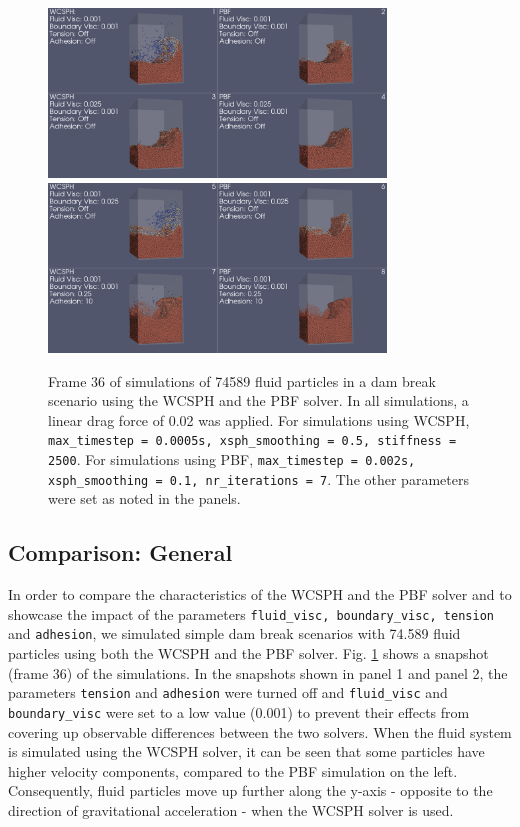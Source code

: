 \documentclass[11pt, letterpaper, twocolumn]{article}
\begin{document}
\begin{figure}[t]
  \centering
  \includegraphics[width=0.8\textwidth]{images/smallDam_IX_X.0036.png}
  \includegraphics[width=0.8\textwidth]{images/smallDam_XI_XII.0036.png}
  \caption{Frame 36 of simulations of 74589 fluid particles in a dam break scenario using the WCSPH and the PBF solver. In all simulations, a linear drag force of 0.02 was applied. For simulations using WCSPH, \texttt{max\_timestep = 0.0005s,
  xsph\_smoothing = 0.5, stiffness = 2500}. For simulations using PBF, \texttt{max\_timestep = 0.002s, xsph\_smoothing = 0.1, nr\_iterations = 7}. The other parameters were set as noted in the panels.}
  \label{fig:dam_comparisons}
\end{figure}

\subsection{Comparison: General}
\label{subsec:comparison_general}
In order to compare the characteristics of the WCSPH and the PBF solver and to showcase the impact of the parameters \texttt{fluid\_visc, boundary\_visc, tension} and \texttt{adhesion}, we simulated simple dam break scenarios with 74.589 fluid particles using both the WCSPH and the PBF solver.
Fig. \ref{fig:dam_comparisons} shows a snapshot (frame 36) of the simulations.
In the snapshots shown in panel 1 and panel 2, the parameters \texttt{tension} and \texttt{adhesion} were turned off and \texttt{fluid\_visc} and \texttt{boundary\_visc} were set to a low value (0.001) to prevent their effects from covering up observable differences between the two solvers.
When the fluid system is simulated using the WCSPH solver, it can be seen that
some particles have higher velocity components, compared to the PBF simulation on the left.
Consequently, fluid particles move up further along the y-axis - opposite to the direction of gravitational acceleration - when the WCSPH solver is used.
\end{document}
